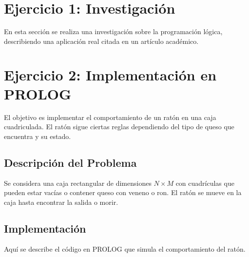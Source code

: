 \documentclass[a4paper,12pt]{article}
\begin{document}
\section{Ejercicio 1: Investigación}
\label{sec:ejercicio1}
En esta sección se realiza una investigación sobre la programación lógica, describiendo una aplicación real citada en un artículo académico.

\section{Ejercicio 2: Implementación en PROLOG}
\label{sec:ejercicio2}
El objetivo es implementar el comportamiento de un ratón en una caja cuadriculada. El ratón sigue ciertas reglas dependiendo del tipo de queso que encuentra y su estado.

\subsection{Descripción del Problema}
Se considera una caja rectangular de dimensiones \(N \times M\) con cuadrículas que pueden estar vacías o contener queso con veneno o ron. El ratón se mueve en la caja hasta encontrar la salida o morir.

\subsection{Implementación}
Aquí se describe el código en PROLOG que simula el comportamiento del ratón.
\end{document}
